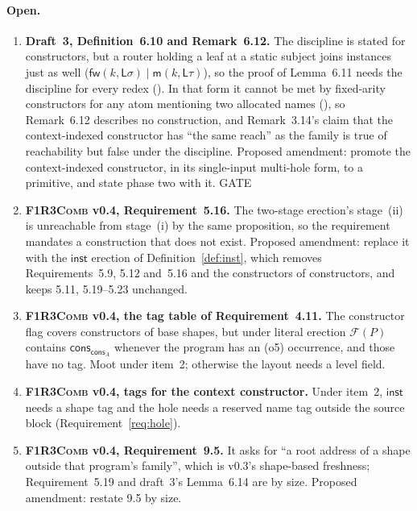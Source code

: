 \documentclass[11pt,a4paper]{article}
\newcommand{\Comb}{\textsc{F1R3Comb}}
\newcommand{\mm}{\mathsf{m}}
\newcommand{\fw}{\mathsf{fw}}
\newcommand{\cons}{\mathsf{cons}}
\theoremstyle{definition}
\theoremstyle{plain}
\newcommand{\Lft}{\mathsf{L}}
\newcommand{\inst}{\mathsf{inst}}
\newcommand{\Fam}{\mathcal{F}}
\begin{document}
\paragraph{Open.}
\begin{enumerate}[leftmargin=1.8em]

\item \textbf{Draft~3, Definition~6.10 and Remark~6.12.} The discipline is
stated for constructors, but a router holding a leaf at a static subject
joins instances just as well ($\fw(k,\Lft\sigma) \mid \mm(k,\Lft\tau)$), so
the proof of Lemma~6.11 needs the discipline for every redex
(\cite[Def.~14.2]{matnote}). In that form it cannot be met by fixed-arity
constructors for any atom mentioning two allocated names
(\cite[Prop.~14.3]{matnote}), so Remark~6.12 describes no construction, and
Remark~3.14's claim that the context-indexed constructor has ``the same
reach'' as the family is true of reachability but false under the
discipline. Proposed amendment: promote the context-indexed constructor, in
its single-input multi-hole form, to a primitive, and state phase two with
it. \textsf{GATE}

\item \textbf{\Comb{} v0.4, Requirement~5.16.} The two-stage erection's
stage~(ii) is unreachable from stage~(i) by the same proposition, so the
requirement mandates a construction that does not exist. Proposed amendment:
replace it with the $\inst$ erection of Definition~\ref{def:inst}, which
removes Requirements~5.9, 5.12 and~5.16 and the constructors of constructors,
and keeps 5.11, 5.19--5.23 unchanged.

\item \textbf{\Comb{} v0.4, the tag table of Requirement~4.11.} The
constructor flag covers constructors of base shapes, but under literal
erection $\Fam(P)$ contains $\cons_{\cons_{A}}$ whenever the program has an
(o5) occurrence, and those have no tag. Moot under item~2; otherwise the
layout needs a level field.

\item \textbf{\Comb{} v0.4, tags for the context constructor.} Under item~2,
$\inst$ needs a shape tag and the hole needs a reserved name tag outside the
source block (Requirement~\ref{req:hole}).

\item \textbf{\Comb{} v0.4, Requirement~9.5.} It asks for ``a root address of
a shape outside that program's family'', which is v0.3's shape-based
freshness; Requirement~5.19 and draft~3's Lemma~6.14 are by size. Proposed
amendment: restate 9.5 by size.


\end{enumerate}
\end{document}
